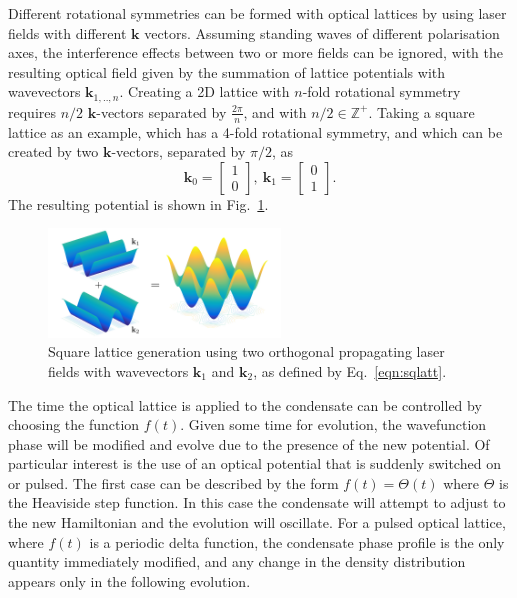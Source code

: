 Different rotational symmetries can be formed with optical lattices by using laser fields with different $\mathbf{k}$ vectors. Assuming standing waves of different polarisation axes, the interference effects between two or more fields can be ignored, with the resulting optical field given by the summation of lattice potentials with wavevectors $\mathbf{k}_{1,..,n}$. Creating a 2D lattice with $n$-fold rotational symmetry requires $n/2$ $\mathbf{k}$-vectors separated by $\frac{2\pi}{n}$, and with $n/2 \in \mathbb{Z}^{+}$. Taking a square lattice as an example, which has a 4-fold rotational symmetry, and which can be created by two $\mathbf{k}$-vectors, separated by $\pi/2$, as
\begin{equation}
    \mathbf{k}_0 = \left[ \begin{array}{cc}
    1 \\
    0
    \end{array} \right],~
    \mathbf{k}_1 =
    \left[ \begin{array}{cc}
     0 \\
     1
    \end{array} \right].\label{eqn:sqlatt}
\end{equation}
The resulting potential is shown in Fig.~\ref{fig:cos2xy}.
\begin{figure}\centering
    \includegraphics[width=0.55\textwidth]{./Images/ch4_vtx/VOPT/squarelatt}
    \caption{Square lattice generation using two orthogonal propagating laser fields with wavevectors $\mathbf{k}_1$ and $\mathbf{k}_2$, as defined by Eq.~\eqref{eqn:sqlatt}.}\label{fig:cos2xy}
\end{figure}
The time the optical lattice is applied to the condensate can be controlled by choosing the function $f(t)$. Given some time for evolution, the wavefunction phase will be modified and evolve due to the presence of the new potential. Of particular interest is the use of an optical potential that is suddenly switched on or pulsed. The first case can be described by the form $f(t) = \Theta(t)$ where $\Theta$ is the Heaviside step function. In this case the condensate will attempt to adjust to the new Hamiltonian and the evolution will oscillate. For a pulsed optical lattice, where $f(t)$ is a periodic delta function, the condensate phase profile is the only quantity immediately modified, and any change in the density distribution appears only in the following evolution.

